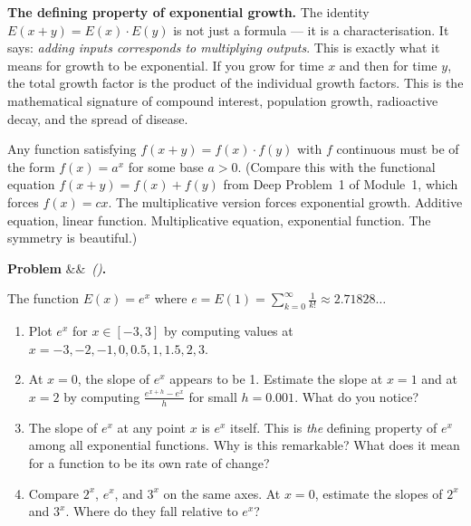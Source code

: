 \documentclass[12pt, a4paper]{article}
\newcounter{problem}
\newenvironment{problem}[1][]{%
  \refstepcounter{problem}%
  \par\vspace{6pt}%
  \noindent\textbf{\color{MidBlue}Problem \theproblem}%
  \ifx&#1&\else\ \textit{(#1)}\fi\textbf{.}\enskip
}{\par\vspace{4pt}}
\begin{document}
\begin{thought}
\textbf{The defining property of exponential growth.}
The identity $E(x+y) = E(x) \cdot E(y)$ is not just a formula --- it is a characterisation. It says: \emph{adding inputs corresponds to multiplying outputs}. This is exactly what it means for growth to be exponential. If you grow for time $x$ and then for time $y$, the total growth factor is the product of the individual growth factors. This is the mathematical signature of compound interest, population growth, radioactive decay, and the spread of disease.

Any function satisfying $f(x+y) = f(x) \cdot f(y)$ with $f$ continuous must be of the form $f(x) = a^x$ for some base $a > 0$. (Compare this with the functional equation $f(x+y) = f(x) + f(y)$ from Deep Problem~1 of Module~1, which forces $f(x) = cx$. The multiplicative version forces exponential growth. Additive equation, linear function. Multiplicative equation, exponential function. The symmetry is beautiful.)
\end{thought}

\begin{problem}
\label{prob:exp_graph}
The function $E(x) = e^x$ where $e = E(1) = \sum_{k=0}^{\infty} \frac{1}{k!} \approx 2.71828\ldots$
\begin{enumerate}[label=(\alph*), topsep=2pt]
  \item Plot $e^x$ for $x \in [-3, 3]$ by computing values at $x = -3, -2, -1, 0, 0.5, 1, 1.5, 2, 3$.
  \item At $x = 0$, the slope of $e^x$ appears to be 1. Estimate the slope at $x = 1$ and at $x = 2$ by computing $\frac{e^{x+h} - e^x}{h}$ for small $h = 0.001$. What do you notice?
  \item The slope of $e^x$ at any point $x$ is $e^x$ itself. This is \emph{the} defining property of $e^x$ among all exponential functions. Why is this remarkable? What does it mean for a function to be its own rate of change?
  \item Compare $2^x$, $e^x$, and $3^x$ on the same axes. At $x = 0$, estimate the slopes of $2^x$ and $3^x$. Where do they fall relative to $e^x$?
\end{enumerate}
\end{problem}

\begin{center}
\end{center}
\end{document}
